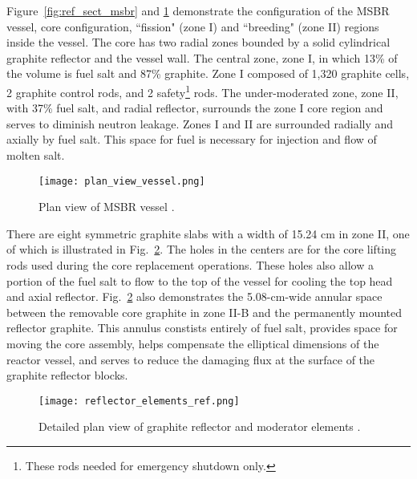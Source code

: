 Figure~\ref{fig:ref_sect_msbr} and \ref{fig:ref_plan_msbr} demonstrate the configuration of the \gls{MSBR} vessel, core configuration, ``fission" (zone I) and ``breeding" (zone II) regions inside the vessel. The core has two radial zones bounded by a solid cylindrical graphite reflector and the vessel wall. The central zone, zone I, in which 13\% of the volume is fuel salt and 87\% graphite. Zone I composed of 1,320 graphite cells, 2 graphite control rods, and 2 safety\footnote{These rods needed for emergency shutdown only.} rods. The under-moderated zone, zone II, with 37\% fuel salt, and radial reflector, surrounds the zone I core region and serves to diminish neutron leakage. Zones I and II are surrounded radially and axially by fuel salt. This space for fuel is necessary for injection and flow of molten salt.

\begin{figure}[hbp!] %
  \centering
  \vspace{-0.3em}
  \texttt{[image: plan\_view\_vessel.png]}
  \caption{Plan view of \gls{MSBR} vessel \cite{robertson_conceptual_1971}.}
  \vspace{-0.6em}
  \label{fig:ref_plan_msbr}
\end{figure}
\FloatBarrier

There are eight symmetric graphite slabs with a width of 15.24 cm in zone II, one of which is illustrated in Fig.~\ref{fig:detail_plan_view}. The holes in the centers are for the core lifting rods used during the core replacement operations. These holes also allow a portion of the fuel salt to flow to the top of the vessel for cooling the top head and axial reflector. Fig.~\ref{fig:detail_plan_view} also demonstrates the 5.08-cm-wide annular space between the removable core graphite in zone II-B and the permanently mounted reflector graphite. This annulus constists entirely of fuel salt, provides space for moving the core assembly, helps compensate the elliptical dimensions of the reactor vessel, and serves to reduce the damaging flux at the surface of the graphite reflector blocks.

\begin{figure}[hbp!] %
  \centering
  \vspace{-0.3em}
  \texttt{[image: reflector\_elements\_ref.png]}
  \caption{Detailed plan view of graphite reflector and moderator elements \cite{robertson_conceptual_1971}.}
  \vspace{-0.6em}
  \label{fig:detail_plan_view}
\end{figure}
\FloatBarrier

